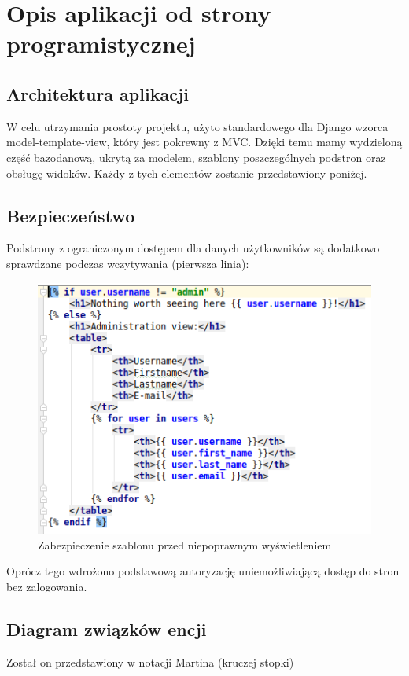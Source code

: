 \documentclass[12pt]{article}
\begin{document}
\section{Opis aplikacji od strony programistycznej}
\subsection{Architektura aplikacji}
W celu utrzymania prostoty projektu, użyto standardowego dla Django wzorca model-template-view, który jest pokrewny z MVC. Dzięki temu mamy wydzieloną część bazodanową, ukrytą za modelem, szablony poszczególnych podstron oraz obsługę widoków. Każdy z tych elementów zostanie przedstawiony poniżej.

\subsection{Bezpieczeństwo}
Podstrony z ograniczonym dostępem dla danych użytkowników są dodatkowo sprawdzane podczas wczytywania (pierwsza linia):
\begin{figure}[H]
	\centering
	\includegraphics[scale=0.7]{img/c_template_security.png}
	\caption{Zabezpieczenie szablonu przed niepoprawnym wyświetleniem}
\end{figure}
Oprócz tego wdrożono podstawową autoryzację uniemożliwiającą dostęp do stron bez zalogowania.

\subsection{Diagram związków encji}
Został on przedstawiony w notacji Martina (kruczej stopki)
\end{document}
